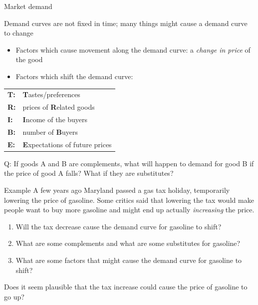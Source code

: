 \documentclass[compress]{beamer}
\begin{document}
\begin{frame}{Market demand}

\begin{block}{ Demand curves are not fixed in time; many things might cause a demand curve to change}
\begin{itemize}
\item Factors which cause movement along the demand curve: a \textit{change in price} of the good
\item Factors which shift the demand curve:
    \end{itemize}
\begin{center}
\begin{tabular}{ll}
\textbf{T: }& \textbf{T}astes/preferences \\
\textbf{R: }& prices of \textbf{R}elated goods \\
\textbf{I:} & \textbf{I}ncome of the buyers \\ 
\textbf{B:} & number of \textbf{B}uyers \\
\textbf{E: }& \textbf{E}xpectations of future prices \\
\end{tabular}
\end{center}
\end{block}
\medskip
   Q:  If goods A and B are complements, what will happen to demand for good B if the price of good A falls? What if they are substitutes?
   
\end{frame}


\begin{frame}{Example}
A few years ago Maryland passed a gas tax holiday, temporarily lowering the price of gasoline. Some critics said that lowering the tax would make people want to buy more gasoline and might end up actually \textit{increasing} the price.

    \begin{enumerate}
        \item Will the tax decrease cause the demand curve for gasoline to shift?
        \item What are some complements and what are some substitutes for gasoline?
        \item What are some factors that might cause the demand curve for gasoline to shift?
    \end{enumerate}

    Does it seem plausible that the tax increase could cause the price of gasoline to go up?

  \end{frame}
\end{document}
